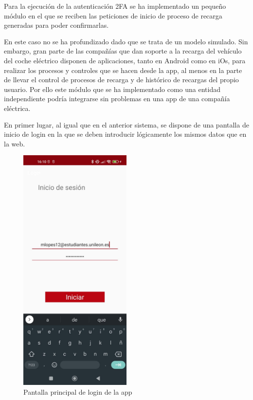 \documentclass[12pt,a4paper,onecolumn,oneside]{report}
\begin{document}
Para la ejecución de la autenticación 2FA se ha implementado un pequeño módulo en el que se reciben las peticiones de inicio de proceso de recarga generadas para poder confirmarlas. 

En este caso no se ha profundizado dado que se trata de un modelo simulado. Sin embargo, gran parte de las compañías que dan soporte a la recarga del vehículo del coche eléctrico disponen de aplicaciones, tanto en Android como en iOs, para realizar los procesos y controles que se hacen desde la app, al menos en la parte de llevar el control de procesos de recarga y de histórico de recargas del propio usuario. Por ello este módulo que se ha implementado como una entidad independiente podría integrarse sin problemas en una app de una compañía eléctrica.

En primer lugar, al igual que en el anterior sistema, se dispone de una pantalla de inicio de login en la que se deben introducir lógicamente los mismos datos que en la web.

\begin{figure}[H] 
\centering
  \includegraphics[width=0.5\textwidth]{figuras/design6.png}
  \caption[Pantalla principal de login de la app]{Pantalla principal de login de la app\\
  }
  \label{fig:design6}
\end{figure}
\end{document}
